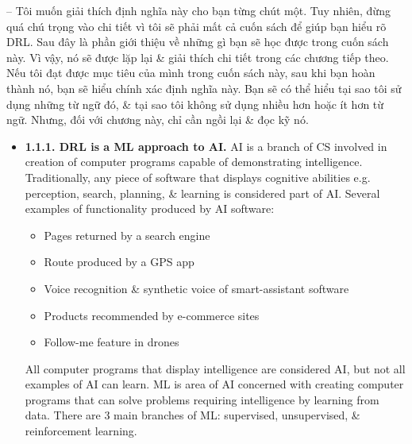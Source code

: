 \documentclass{article}
\begin{document}
\begin{itemize}
\begin{itemize}
        -- Tôi muốn giải thích định nghĩa này cho bạn từng chút một. Tuy nhiên, đừng quá chú trọng vào chi tiết vì tôi sẽ phải mất cả cuốn sách để giúp bạn hiểu rõ DRL. Sau đây là phần giới thiệu về những gì bạn sẽ học được trong cuốn sách này. Vì vậy, nó sẽ được lặp lại \& giải thích chi tiết trong các chương tiếp theo. Nếu tôi đạt được mục tiêu của mình trong cuốn sách này, sau khi bạn hoàn thành nó, bạn sẽ hiểu chính xác định nghĩa này. Bạn sẽ có thể hiểu tại sao tôi sử dụng những từ ngữ đó, \& tại sao tôi không sử dụng nhiều hơn hoặc ít hơn từ ngữ. Nhưng, đối với chương này, chỉ cần ngồi lại \& đọc kỹ nó.
        \begin{itemize}
            \item {\bf1.1.1. DRL is a ML approach to AI.} AI is a branch of CS involved in creation of computer programs capable of demonstrating intelligence. Traditionally, any piece of software that displays cognitive abilities e.g. perception, search, planning, \& learning is considered part of AI. Several examples of functionality produced by AI software:
            \begin{itemize}
                \item Pages returned by a search engine
                \item Route produced by a GPS app
                \item Voice recognition \& synthetic voice of smart-assistant software
                \item Products recommended by e-commerce sites
                \item Follow-me feature in drones
            \end{itemize}
            All computer programs that display intelligence are considered AI, but not all examples of AI can learn. ML is area of AI concerned with creating computer programs that can solve problems requiring intelligence by learning from data. There are 3 main branches of ML: supervised, unsupervised, \& reinforcement learning.


\end{itemize}
\end{itemize}
\end{itemize}
\end{document}
